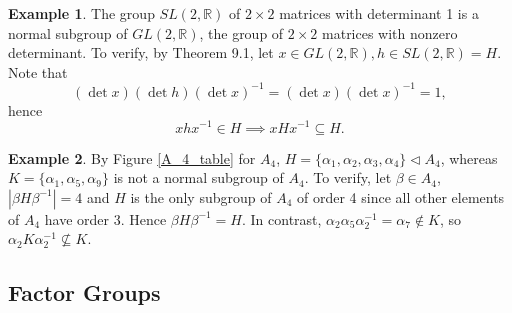 \documentclass{article}
\newtheorem{theorem}{Theorem}[section]
\theoremstyle{definition}
\newtheorem{example}{Example}[section]
\begin{document}
     \begin{example}
            The group $SL(2,\mathbb{R})$ of $2\times2$ matrices with determinant 1 is a normal subgroup of $GL(2,\mathbb{R})$, the group of $2\times2$ matrices with nonzero determinant. To verify, by Theorem 9.1, let $x \in GL(2,\mathbb{R}), h \in SL(2,\mathbb{R}) = H$. Note that
            \begin{equation*}
                (\det x)(\det h)(\det x)^{-1} = (\det x)(\det x)^{-1} = 1,
            \end{equation*}
            hence 
            \begin{equation*}
                xhx^{-1} \in H \implies xHx^{-1} \subseteq H.
            \end{equation*}
     \end{example}
     
     \begin{example}
        By Figure \ref{A_4_table} for $A_4$, $H=\{\alpha_1,\alpha_2,\alpha_3,\alpha_4\} \lhd A_4$, whereas $K = \{\alpha_1,\alpha_5,\alpha_9\}$ is not a normal subgroup of $A_4$. To verify, let $\beta \in A_4$, $|\beta H \beta^{-1}| = 4$ and $H$ is the only subgroup of $A_4$ of order 4 since all other elements of $A_4$ have order 3. Hence $\beta H \beta^{-1} = H$. In contrast, $\alpha_2\alpha_5\alpha_2^{-1} = \alpha_7 \notin K$, so $\alpha_2 K \alpha_2^{-1} \nsubseteq K$.
     \end{example}
     
     \subsection{Factor Groups}
     
\end{document}
